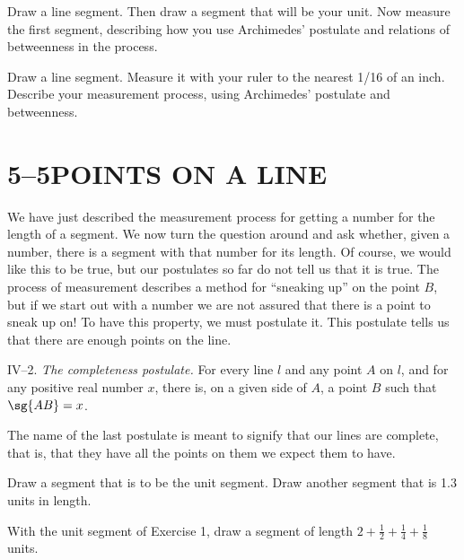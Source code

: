 \documentclass[11pt]{book}
\theoremstyle{bkplain}
\theoremstyle{XIplainnote}
\theoremstyle{bkplain}
\theoremstyle{bkplain}
\begin{document}
\begin{exercisecols}
\begin{exlist}
\item Draw a line segment. Then draw a segment that will be your unit. Now
      measure the first segment, describing how you use Archimedes' postulate
      and relations of betweenness in the process.
\item Draw a line segment. Measure it with your ruler to the nearest 1/16 of an
      inch. Describe your measurement process, using Archimedes' postulate and
      betweenness.
\end{exlist}
\end{exercisecols}

\section*{5--5\quad POINTS ON A LINE}

We have just described the measurement process for getting a number for the
length of a segment. We now turn the question around and ask whether, given a
number, there is a segment with that number for its length. Of course, we would
like this to be true, but our postulates so far do not tell us that it is true.
The process of measurement describes a method for ``sneaking up'' on the point
$B$, but if we start out with a number we are not assured that there is a point
to sneak up on! To have this property, we must postulate it. This postulate
tells us that there are enough points on the line.

\medskip
IV--2. \emph{The completeness postulate.} For every line $l$ and any point $A$
on $l$, and for any positive real number $x$, there is, on a given side of $A$,
a point $B$ such that $\sg{AB} = x$.

\medskip
The name of the last postulate is meant to signify that our lines are complete,
that is, that they have all the points on them we expect them to have.


\begin{exercisecols}
\begin{exlist}
\item Draw a segment that is to be the unit segment. Draw another segment that
      is 1.3 units in length.
\item With the unit segment of Exercise 1, draw a segment of length
      $2 + \frac{1}{2} + \frac{1}{4} + \frac{1}{8}$ units.
\end{exlist}
\end{exercisecols}
\end{document}
